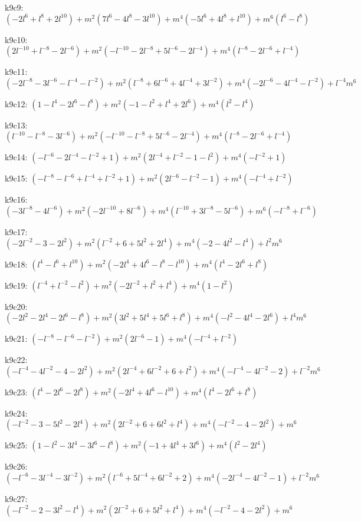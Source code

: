 k9c9: $ (-2l^{6}+l^{8}+2l^{10})  +m^{2}(7l^{6}-4l^{8}-3l^{10})  +m^{4}(-5l^{6}+4l^{8}+l^{10})  +m^{6}(l^{6}-l^{8}) $ 

k9c10: $ (2l^{-10}+l^{-8}-2l^{-6})  +m^{2}(-l^{-10}-2l^{-8}+5l^{-6}-2l^{-4})  +m^{4}(l^{-8}-2l^{-6}+l^{-4}) $ 

k9c11: $ (-2l^{-8}-3l^{-6}-l^{-4}-l^{-2})  +m^{2}(l^{-8}+6l^{-6}+4l^{-4}+3l^{-2})  +m^{4}(-2l^{-6}-4l^{-4}-l^{-2})  +l^{-4}m^{6} $ 

k9c12: $ (1-l^{4}-2l^{6}-l^{8})  +m^{2}(-1-l^{2}+l^{4}+2l^{6})  +m^{4}(l^{2}-l^{4}) $ 

k9c13: $ (l^{-10}-l^{-8}-3l^{-6})  +m^{2}(-l^{-10}-l^{-8}+5l^{-6}-2l^{-4})  +m^{4}(l^{-8}-2l^{-6}+l^{-4}) $ 

k9c14: $ (-l^{-6}-2l^{-4}-l^{-2}+1)  +m^{2}(2l^{-4}+l^{-2}-1-l^{2})  +m^{4}(-l^{-2}+1) $ 

k9c15: $ (-l^{-8}-l^{-6}+l^{-4}+l^{-2}+1)  +m^{2}(2l^{-6}-l^{-2}-1)  +m^{4}(-l^{-4}+l^{-2}) $ 

k9c16: $ (-3l^{-8}-4l^{-6})  +m^{2}(-2l^{-10}+8l^{-6})  +m^{4}(l^{-10}+3l^{-8}-5l^{-6})  +m^{6}(-l^{-8}+l^{-6}) $ 

k9c17: $ (-2l^{-2}-3-2l^{2})  +m^{2}(l^{-2}+6+5l^{2}+2l^{4})  +m^{4}(-2-4l^{2}-l^{4})  +l^{2}m^{6} $ 

k9c18: $ (l^{4}-l^{6}+l^{10})  +m^{2}(-2l^{4}+4l^{6}-l^{8}-l^{10})  +m^{4}(l^{4}-2l^{6}+l^{8}) $ 

k9c19: $ (l^{-4}+l^{-2}-l^{2})  +m^{2}(-2l^{-2}+l^{2}+l^{4})  +m^{4}(1-l^{2}) $ 

k9c20: $ (-2l^{2}-2l^{4}-2l^{6}-l^{8})  +m^{2}(3l^{2}+5l^{4}+5l^{6}+l^{8})  +m^{4}(-l^{2}-4l^{4}-2l^{6})  +l^{4}m^{6} $ 

k9c21: $ (-l^{-8}-l^{-6}-l^{-2})  +m^{2}(2l^{-6}-1)  +m^{4}(-l^{-4}+l^{-2}) $ 

k9c22: $ (-l^{-4}-4l^{-2}-4-2l^{2})  +m^{2}(2l^{-4}+6l^{-2}+6+l^{2})  +m^{4}(-l^{-4}-4l^{-2}-2)  +l^{-2}m^{6} $ 

k9c23: $ (l^{4}-2l^{6}-2l^{8})  +m^{2}(-2l^{4}+4l^{6}-l^{10})  +m^{4}(l^{4}-2l^{6}+l^{8}) $ 

k9c24: $ (-l^{-2}-3-5l^{2}-2l^{4})  +m^{2}(2l^{-2}+6+6l^{2}+l^{4})  +m^{4}(-l^{-2}-4-2l^{2})  +m^{6} $ 

k9c25: $ (1-l^{2}-3l^{4}-3l^{6}-l^{8})  +m^{2}(-1+4l^{4}+3l^{6})  +m^{4}(l^{2}-2l^{4}) $ 

k9c26: $ (-l^{-6}-3l^{-4}-3l^{-2})  +m^{2}(l^{-6}+5l^{-4}+6l^{-2}+2)  +m^{4}(-2l^{-4}-4l^{-2}-1)  +l^{-2}m^{6} $ 

k9c27: $ (-l^{-2}-2-3l^{2}-l^{4})  +m^{2}(2l^{-2}+6+5l^{2}+l^{4})  +m^{4}(-l^{-2}-4-2l^{2})  +m^{6} $ 

